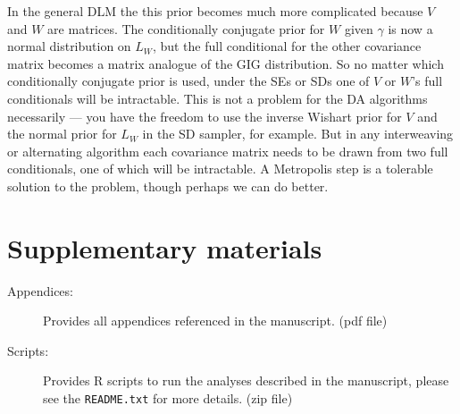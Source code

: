 \documentclass[12pt]{article}
\begin{document}
In the general DLM the this prior becomes much more complicated because $V$ and $W$ are matrices. The conditionally conjugate prior for $W$ given $\gamma$ is now a normal distribution on $L_W$, but the full conditional for the other covariance matrix becomes a matrix analogue of the GIG distribution. So no matter which conditionally conjugate prior is used, under the SEs or SDs one of $V$ or $W$'s full conditionals will be intractable. This is not a problem for the DA algorithms necessarily --- you have the freedom to use the inverse Wishart prior for $V$ and the normal prior for $L_W$ in the SD sampler, for example. But in any interweaving or alternating algorithm each covariance matrix needs to be drawn from two full conditionals, one of which will be intractable. A Metropolis step is a tolerable solution to the problem, though perhaps we can do better.

\section{Supplementary materials}\label{sec:Supp}

\begin{description}

\item[Appendices:] Provides all appendices referenced in the manuscript. (pdf file)

\item[Scripts:] Provides R scripts to run the analyses described in the manuscript, please see the \texttt{README.txt} for more details. (zip file)

\end{description}
\end{document}
